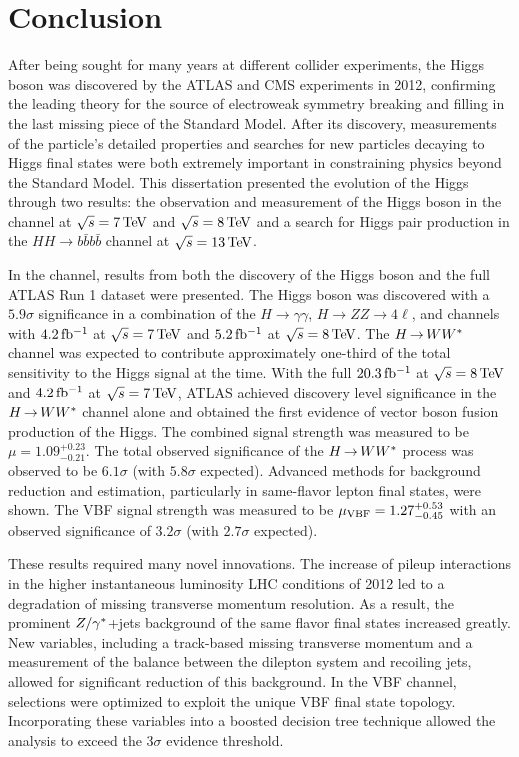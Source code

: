 \chapter{Conclusion}
\label{conclusion}

After being sought for many years at different collider experiments, the Higgs boson was discovered by the ATLAS and CMS experiments in 2012, confirming the leading theory for the source of electroweak symmetry breaking and filling in the last missing piece of the Standard Model. After its discovery, measurements of the particle's detailed properties and searches for new particles decaying to Higgs final states were both extremely important in constraining physics beyond the Standard Model. This dissertation presented the evolution of the Higgs through two results: the observation and measurement of the Higgs boson in the \HWWfull channel at $\sqrt{s} = 7 \TeV$ and $\sqrt{s} = 8 \TeV$ and a search for Higgs pair production in the $HH\to b\bar{b}b\bar{b}$ channel at $\sqrt{s} = 13 \TeV$.

In the \HWWfull channel, results from both the discovery of the Higgs boson and the full ATLAS Run 1 dataset were presented. The Higgs boson was discovered with a $5.9\sigma$ significance in a combination of the $H\to\gamma\gamma$, $H\to ZZ \to 4\ell$, and \HWWfull channels with $4.2\mbox{\,fb$^{-1}$}$ at $\sqrt{s} = 7 \TeV$ and $5.2\mbox{\,fb$^{-1}$}$ at $\sqrt{s} = 8 \TeV$. The $H{\,{\rightarrow}\,}WW^\ast$ channel was expected to contribute approximately one-third of the total sensitivity to the Higgs signal at the time. With the full $20.3\mbox{\,fb$^{-1}$}$ at $\sqrt{s} =  8 \TeV$ and $4.2\mbox{\,fb$^{-1}$}$ at $\sqrt{s} = 7 \TeV$, ATLAS achieved discovery level significance in the $H{\,{\rightarrow}\,}WW^\ast$ channel alone and obtained the first evidence of vector boson fusion production of the Higgs. The combined signal strength was measured to be $\mu = 1.09^{+0.23}_{-0.21}$. The total observed significance of the $H{\,{\rightarrow}\,}WW^\ast$ process was observed to be $6.1\sigma$ (with $5.8 \sigma$ expected). Advanced methods for background reduction and estimation, particularly in same-flavor lepton final states, were shown. The VBF signal strength was measured to be $\mu_{\rm VBF} = 1.27^{+0.53}_{-0.45}$ with an observed significance of $3.2\sigma$ (with $2.7 \sigma$ expected). 

These results required many novel innovations. The increase of pileup interactions in the higher instantaneous luminosity LHC conditions of 2012 led to a degradation of missing transverse momentum resolution. As a result, the prominent $Z/\gamma^{\ast}$+jets background of the same flavor \HWWfull final states increased greatly. New variables, including a track-based missing transverse momentum and a measurement of the balance between the dilepton system and recoiling jets, allowed for significant reduction of this background. In the VBF channel, selections were optimized to exploit the unique VBF final state topology. Incorporating these variables into a boosted decision tree technique allowed the analysis to exceed the $3\sigma$ evidence threshold.

